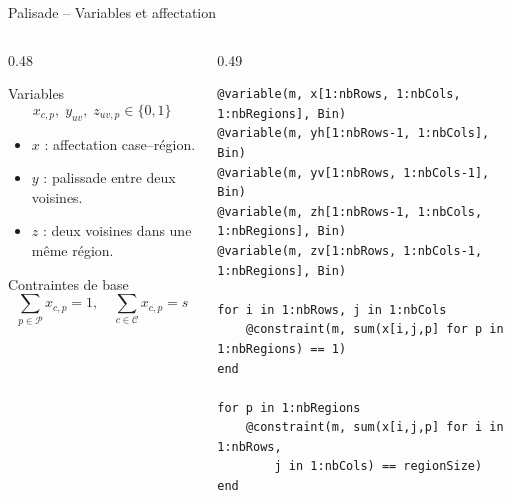 \documentclass[11pt,aspectratio=169]{beamer}
\newcommand{\CellSet}{\mathcal{C}}
\newcommand{\RegSet}{\mathcal{P}}
\newcommand{\binary}{\{0,1\}}
\begin{document}
\begin{frame}[fragile]{Palisade -- Variables et affectation}
\footnotesize
\begin{columns}[T,onlytextwidth]
\begin{column}{0.48\textwidth}
\begin{block}{Variables}
\[
x_{c,p},\;y_{uv},\;z_{uv,p}\in\binary
\]
\begin{itemize}
  \item \(x\) : affectation case--région.
  \item \(y\) : palissade entre deux voisines.
  \item \(z\) : deux voisines dans une même région.
\end{itemize}
\end{block}
\begin{block}{Contraintes de base}
\[
\sum_{p\in\RegSet}x_{c,p}=1,\quad
\sum_{c\in\CellSet}x_{c,p}=s
\]
\end{block}
\end{column}
\begin{column}{0.49\textwidth}
\begin{lstlisting}[basicstyle=\ttfamily\fontsize{5.4}{6.1}\selectfont]
@variable(m, x[1:nbRows, 1:nbCols, 1:nbRegions], Bin)
@variable(m, yh[1:nbRows-1, 1:nbCols], Bin)
@variable(m, yv[1:nbRows, 1:nbCols-1], Bin)
@variable(m, zh[1:nbRows-1, 1:nbCols, 1:nbRegions], Bin)
@variable(m, zv[1:nbRows, 1:nbCols-1, 1:nbRegions], Bin)

for i in 1:nbRows, j in 1:nbCols
    @constraint(m, sum(x[i,j,p] for p in 1:nbRegions) == 1)
end

for p in 1:nbRegions
    @constraint(m, sum(x[i,j,p] for i in 1:nbRows,
        j in 1:nbCols) == regionSize)
end
\end{lstlisting}
\end{column}
\end{columns}
\end{frame}
\end{document}
